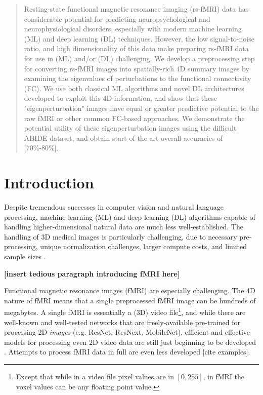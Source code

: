 \documentclass[10pt]{article}
\begin{document}
\maketitle

\begin{abstract}
  Resting-state functional magnetic resonance imaging (rs-fMRI) data has considerable potential for
  predicting neuropsychological and neurophysiological disorders, especially with modern machine
  learning (ML) and deep learning (DL) techniques. However, the low signal-to-noise ratio, and high
  dimensionality of this data make preparing rs-fMRI data for use in (ML) and/or (DL) challenging.
  We develop a preprocessing step for converting rs-fMRI images into spatially-rich 4D summary
  images by examining the eigenvalues of perturbations to the functional connectivity (FC). We use
  both classical ML algorithms and novel DL architectures developed to exploit this 4D information,
  and show that these "eigenperturbation" images have equal or greater predictive potential to the
  raw fMRI or other common FC-based approaches. We demonstrate the potential utility of these
  eigenperturbation images using the difficult ABIDE dataset, and obtain start of the art overall
  accuracies of [70\%-80\%].
\end{abstract}

\section{Introduction}

Despite tremendous successes in computer vision and natural language processing, machine learning
(ML) and deep learning (DL) algorithms capable of handling higher-dimensional natural data are much
less well-established. The handling of 3D medical images is particularly challenging, due to
necessary pre-processing, unique normalization challenges, larger compute costs, and limited
sample sizes \citep[see][for a general review]{singh3DDeepLearning2020}.

\footnotesize
\textbf{[insert tedious paragraph introducing fMRI here]}
\normalsize

Functional magnetic resonance images (fMRI) are especially challenging. The 4D nature of fMRI
means that a single preprocessed fMRI image can be hundreds of megabytes. A single fMRI is
essentially a (3D) video file\footnote{Except that while in a video file pixel values are in \([0,
255]\), in fMRI the voxel values can be any floating point value.}, and while there are well-known
and well-tested networks that are freely-available pre-trained for processing 2D \emph{images} (e.g.
ResNet, ResNext, MobileNet), efficient and effective models for processing even 2D video data are
still just beginning to be developed
\citep{xieRethinkingSpatiotemporalFeature2018,tranCloserLookSpatiotemporal2018,wangVideoModelingCorrelation2020}.
Attempts to process fMRI data in full are even less developed [cite examples].
\end{document}
